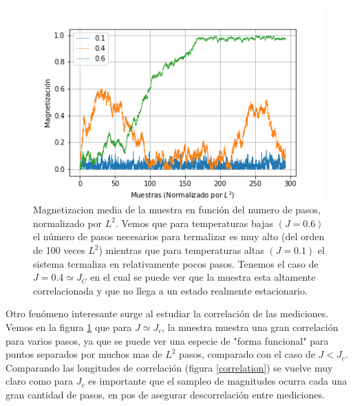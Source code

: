 \documentclass[
 reprint,
 amsmath,amssymb,
 aps,
]{revtex4-1}
\begin{document}
\begin{figure}
  \includegraphics[width=1.0\columnwidth]{images/termalizacion.png}
  \caption{Magnetizacion media de la muestra en funci\'on del numero de pasos,
    normalizado por $L^2$. Vemos que para temperaturas bajas $(J = 0.6)$ el
    n\'umero de pasos necesarios para termalizar es muy alto (del orden de 100
    veces $L^2$) mientras que para temperaturas altas $(J = 0.1)$ el sistema
    termaliza en relativamente pocos pasos. Tenemos el caso de $J = 0.4
    \simeq J_C$ en el cual se puede ver que la muestra esta altamente
    correlacionada y que no llega a un estado realmente estacionario.}
  \label{termalizacion}
\end{figure}

Otro fen\'omeno interesante surge al estudiar la correlaci\'on de las
mediciones. Vemos en la figura \ref{termalizacion} que para $J \simeq J_c$, la
muestra muestra una gran correlaci\'on para varios pasos, ya que se puede ver
una especie de "forma funcional" para puntos separados por muchos mas de $L^2$
pasos, comparado con el caso de $J < J_c$. Comparando las longitudes de
correlaci\'on (figura \ref{correlation}) se vuelve muy claro como para $J_c$
es importante que el sampleo de magnitudes ocurra cada una gran cantidad de
pasos, en pos de asegurar descorrelaci\'on entre mediciones.
\end{document}
